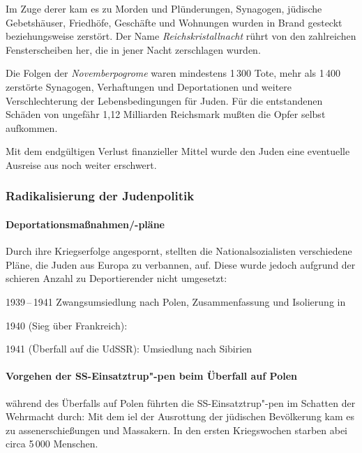 Im Zuge derer kam es zu Morden und Plünderungen, Synagogen, jüdische
Gebetshäuser, Friedhöfe, Geschäfte und Wohnungen wurden in Brand
gesteckt beziehungsweise zerstört. Der Name \emph{Reichskristallnacht}
rührt von den zahlreichen Fensterscheiben her, die in jener Nacht
zerschlagen wurden.

Die Folgen der \emph{Novemberpogrome} waren mindestens 1\,300 Tote,
mehr als 1\,400 zerstörte Synagogen, Verhaftungen und Deportationen
und weitere Verschlechterung der Lebensbedingungen für Juden. Für die
entstandenen Schäden von ungefähr 1,12 Milliarden Reichsmark mußten
die Opfer selbst aufkommen.

Mit dem endgültigen Verlust finanzieller Mittel wurde den Juden eine
eventuelle Ausreise aus noch weiter erschwert.


\subsubsection[Radikalisierung der Judenpolitik \dat{September
1939\,--\,1941}]
{Radikalisierung der Judenpolitik }
\label{sss:rad-jud-pol}

\paragraph{Deportationsmaßnahmen/-pläne} 
Durch ihre Kriegserfolge angespornt, stellten die Nationalsozialisten
verschiedene Pläne, die Juden aus Europa zu verbannen, auf. Diese
wurde jedoch aufgrund der schieren Anzahl zu Deportierender nicht
umgesetzt: 

\begin{chronik}
\item[1939\,--\,1941]
Zwangsumsiedlung nach Polen, Zusammenfassung und Isolierung in
 

\item[1940]
(Sieg über Frankreich):  

\item[1941]
(Überfall auf die UdSSR): Umsiedlung nach Sibirien
\end{chronik}


\paragraph{Vorgehen der SS-Einsatztrup"-pen beim Überfall auf Polen}
während des Überfalls auf Polen führten die SS-Einsatztrup"-pen im
Schatten der Wehrmacht  durch: Mit dem
iel der Ausrottung der jüdischen Bevölkerung kam es zu
assenerschießungen und Massakern. In den ersten Kriegswochen starben
abei circa 5\,000 Menschen.

